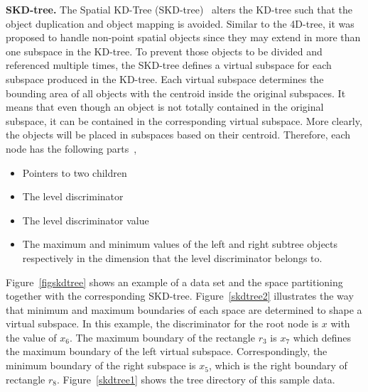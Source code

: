 \documentclass[a4paper,12pt]{article}
\begin{document}
\textbf{SKD-tree.} The Spatial KD-Tree (SKD-tree)~\cite{skdtree} alters the KD-tree such that the object duplication and object mapping is avoided. Similar to the 4D-tree, it was proposed to handle non-point spatial objects since they may extend in more than one subspace in the KD-tree. To prevent those objects to be divided and referenced multiple times, the SKD-tree defines a virtual subspace for each subspace produced in the KD-tree. Each virtual subspace determines the bounding area of all objects with the centroid inside the original subspaces. It means that even though an object is not totally contained in the original subspace, it can be contained in the corresponding virtual subspace. More clearly, the objects will be placed in subspaces based on their centroid. Therefore, each node has the following parts~\cite{skdtreebook},
\begin{itemize}
\item Pointers to two children
\item The level discriminator
\item The level discriminator value
\item The maximum and minimum values of the left and right subtree objects respectively in the dimension that the level discriminator belongs to.
\end{itemize}    
Figure~\ref{figskdtree} shows an example of a data set and the space partitioning together with the corresponding SKD-tree. Figure~\ref{skdtree2} illustrates the way that minimum and maximum boundaries of each space are determined to shape a virtual subspace. In this example, the discriminator for the root node is $x$ with the value of $x_6$.
The maximum boundary of the rectangle $r_3$ is $x_7$ which defines the maximum boundary of the left virtual subspace. Correspondingly, the minimum boundary of the right subspace is $x_5$, which is the right boundary of rectangle $r_8$. Figure~\ref{skdtree1} shows the tree directory of this sample data.
\end{document}
